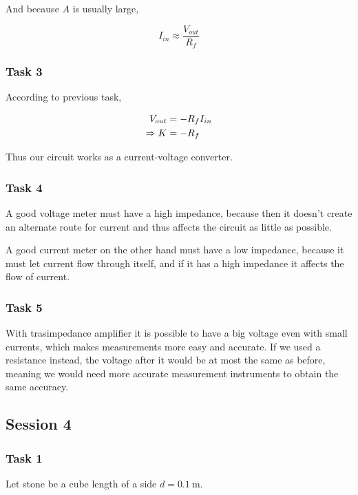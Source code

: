 \documentclass[12pt]{article}
\begin{document}
And because $A$ is usually large,

\begin{equation*}
I_{in} \approx \frac{V_{out}}{R_f}
\end{equation*}

\subsubsection{Task 3} \label{sec:K}
According to previous task,

\begin{align}
V_{out} &= -R_f I_{in} \notag \\
\Rightarrow K &= -R_f
\label{eqn:K}
\end{align}

Thus our circuit works as a current-voltage converter.

\subsubsection{Task 4}

A good voltage meter must have a high impedance, because then it doesn't create an alternate route for current and thus affects the circuit as little as possible.

A good current meter on the other hand must have a low impedance, because it must let current flow through itself, and if it has a high impedance it affects the flow of current.


\subsubsection{Task 5}
With trasimpedance amplifier it is possible to have a big voltage even with small currents, which makes measurements more easy and accurate. If we used a resistance instead, the voltage after it would be at most the same as before, meaning we would need more accurate measurement instruments to obtain the same accuracy.

\subsection{Session 4}

\subsubsection{Task 1}

Let stone be a cube length of a side $d = \SI{0.1}{\metre}$.
\end{document}
